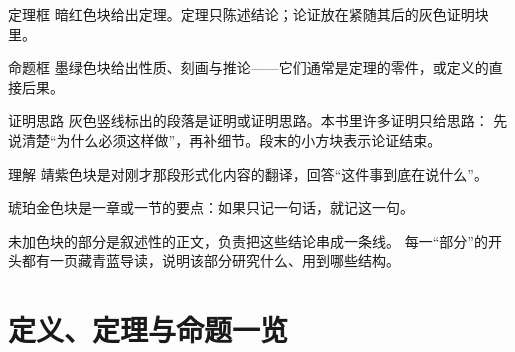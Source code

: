 \documentclass[UTF8, fontset=none, 11pt, twoside, openright]{ctexbook}
\begin{document}
\begin{jthm*}{定理框}{}
暗红色块给出定理。定理只陈述结论；论证放在紧随其后的灰色证明块里。
\end{jthm*}

\begin{jprop*}{命题框}{}
墨绿色块给出性质、刻画与推论——它们通常是定理的零件，或定义的直接后果。
\end{jprop*}

\begin{jproof}{证明思路}
灰色竖线标出的段落是证明或证明思路。本书里许多证明只给思路：
先说清楚“为什么必须这样做”，再补细节。段末的小方块表示论证结束。
\end{jproof}

\begin{jidea}{理解}
靖紫色块是对刚才那段形式化内容的翻译，回答“这件事到底在说什么”。
\end{jidea}

\begin{jinsight}
琥珀金色块是一章或一节的要点：如果只记一句话，就记这一句。
\end{jinsight}

未加色块的部分是叙述性的正文，负责把这些结论串成一条线。
每一“部分”的开头都有一页藏青蓝导读，说明该部分研究什么、用到哪些结构。

\cleardoublepage
\tableofcontents

\mainmatter


\backmatter
\cleardoublepage
{}
{}
\chapter*{定义、定理与命题一览}
\end{document}
